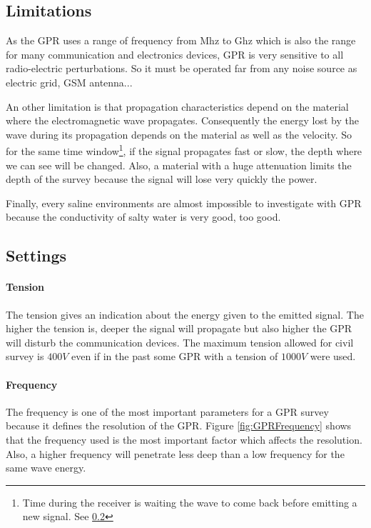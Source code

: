 \subsection{Limitations}

As the GPR uses a range of frequency from Mhz to Ghz which is also the range for many communication and electronics devices, GPR is very sensitive to all radio-electric perturbations. So it must be operated far from any noise source as electric grid, GSM antenna...

An other limitation is that propagation characteristics depend on the material where the electromagnetic wave propagates. Consequently the energy lost by the wave during its propagation depends on the material as well as the velocity. So for the same time window\footnote{Time during the receiver is waiting the wave to come back before emitting a new signal. See \ref{SubSection:settings}}, if the signal propagates fast or slow, the depth where we can see will be changed. Also, a material with a huge attenuation limits the depth of the survey because the signal will lose very quickly the power.

Finally, every saline environments are almost impossible to investigate with GPR because the conductivity of salty water is very good, too good\cite{UnderstandingDetection}.

\subsection{Settings} \label{SubSection:settings}


\paragraph{Tension} The tension gives an indication about the energy given to the emitted signal. The higher the tension is, deeper the signal will propagate but also higher the GPR will disturb the communication devices. The maximum tension allowed for civil survey is $400V$ even if in the past some GPR with a tension of $1000V$ were used. 

\paragraph{Frequency} The frequency is one of the most important parameters for a GPR survey because it defines the resolution of the GPR. Figure \ref{fig:GPRFrequency} shows that the frequency used is the most important factor which affects the resolution. Also, a higher frequency will penetrate less deep than a low frequency for the same wave energy.

